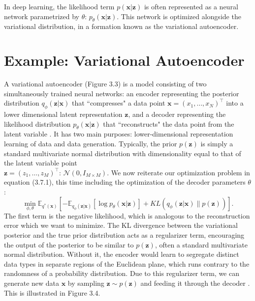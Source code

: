 \documentclass[honours,12pt]{unswthesis}
\newcommand{\E}{\mathbb{E}}
\numberwithin{equation}{section}
\theoremstyle{definition}
\begin{document}
In deep learning, the likelihood term $p(\bm{x}|\bm{z})$ is often represented as a neural network parametrized by $\theta$: $p_\theta(\bm{x}|\bm{z})$. This network is optimized alongside the variational distribution, in a formation known as the variational autoencoder.
\section{Example: Variational Autoencoder}
A variational autoencoder (Figure 3.3) is a model consisting of two simultaneously trained neural networks: an encoder representing the posterior distribution $q_\phi(\bm{z}|\bm{x})$ that ``compresses" a data point $\bm{x}=(x_1,\dots,x_N)^\top$ into a lower dimensional latent representation $\bm{z}$, and a decoder representing the likelihood distribution $p_\theta(\bm{x}|\bm{z})$ that ``reconstructs" the data point from the latent variable \citep{kingma}. It has two main purposes: lower-dimensional representation learning of data and data generation. Typically, the prior $p(\bm{z})$ is simply a standard multivariate normal distribution with dimensionality equal to that of the latent variable point \\$\bm{z}=(z_1,\dots,z_M)^\top$: $\mathcal{N}(0,I_{M\times M})$. We now reiterate our optimization problem in equation (3.7.1), this time including the optimization of the decoder parameters $\theta$:
\begin{equation}
\min_{\phi,\theta} \mathbb{E}_{q^*(\bm{x})}\left[-\E_{q_\phi(\bm{z}|\bm{x})}[\log p_\theta(\bm{x}|\bm{z})]+KL(q_\phi(\bm{z}|\bm{x})\|p(\bm{z}))\right].
\end{equation}
The first term is the negative likelihood, which is analogous to the reconstruction error which we want to minimize. The KL divergence between the variational posterior and the true prior distribution acts as a regularizer term, encouraging the output of the posterior to be similar to $p(\bm{z})$, often a standard multivariate normal distribution. Without it, the encoder would learn to segregate distinct data types in separate regions of the Euclidean plane, which runs contrary to the randomness of a probability distribution. Due to this regularizer term, we can generate new data $\bm{x}$ by sampling $\bm{z}\sim p(\bm{z})$ and feeding it through the decoder \citep{vae}. This is illustrated in Figure 3.4.
\end{document}
